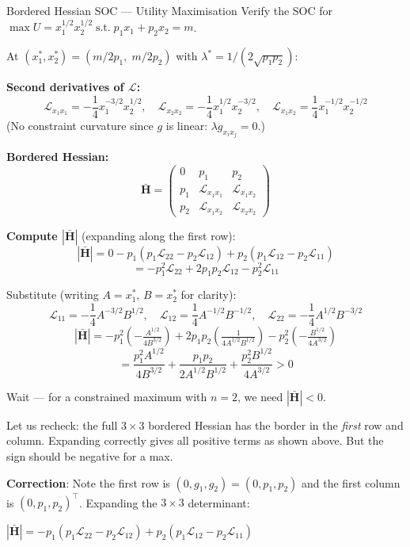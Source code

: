 \documentclass[12pt, a4paper]{article}
\theoremstyle{definition}
\newcommand{\bH}{\mathbf{H}}
\newcommand{\st}{\;\text{s.t.}\;}
\begin{document}
\begin{exbox}{Bordered Hessian SOC --- Utility Maximisation}
Verify the SOC for $\max U = x_1^{1/2}x_2^{1/2} \st p_1 x_1+p_2 x_2 = m$.

At $(x_1^*, x_2^*) = (m/2p_1,\; m/2p_2)$ with
$\lambda^* = 1/(2\sqrt{p_1 p_2})$:

\textbf{Second derivatives of $\mathcal{L}$:}
\[
  \mathcal{L}_{x_1 x_1} = -\frac{1}{4}x_1^{-3/2}x_2^{1/2}, \quad
  \mathcal{L}_{x_2 x_2} = -\frac{1}{4}x_1^{1/2}x_2^{-3/2}, \quad
  \mathcal{L}_{x_1 x_2} = \frac{1}{4}x_1^{-1/2}x_2^{-1/2}
\]
(No constraint curvature since $g$ is linear: $\lambda g_{x_i x_j} = 0$.)

\textbf{Bordered Hessian:}
\[
  \bar{\bH} = \begin{pmatrix}
    0 & p_1 & p_2 \\
    p_1 & \mathcal{L}_{x_1 x_1} & \mathcal{L}_{x_1 x_2} \\
    p_2 & \mathcal{L}_{x_1 x_2} & \mathcal{L}_{x_2 x_2}
  \end{pmatrix}
\]

\textbf{Compute $|\bar{\bH}|$} (expanding along the first row):
\[
  |\bar{\bH}|
  = 0 - p_1(p_1 \mathcal{L}_{22} - p_2 \mathcal{L}_{12})
    + p_2(p_1 \mathcal{L}_{12} - p_2 \mathcal{L}_{11})
\]
\[
  = -p_1^2\mathcal{L}_{22} + 2p_1 p_2 \mathcal{L}_{12} - p_2^2 \mathcal{L}_{11}
\]

Substitute (writing $A = x_1^*$, $B = x_2^*$ for clarity):
\[
  \mathcal{L}_{11} = -\frac{1}{4}A^{-3/2}B^{1/2}, \quad
  \mathcal{L}_{12} = \frac{1}{4}A^{-1/2}B^{-1/2}, \quad
  \mathcal{L}_{22} = -\frac{1}{4}A^{1/2}B^{-3/2}
\]
\[
  |\bar{\bH}|
  = -p_1^2\!\left(-\tfrac{A^{1/2}}{4B^{3/2}}\right)
    + 2p_1 p_2\!\left(\tfrac{1}{4A^{1/2}B^{1/2}}\right)
    - p_2^2\!\left(-\tfrac{B^{1/2}}{4A^{3/2}}\right)
\]
\[
  = \frac{p_1^2 A^{1/2}}{4B^{3/2}}
    + \frac{p_1 p_2}{2A^{1/2}B^{1/2}}
    + \frac{p_2^2 B^{1/2}}{4A^{3/2}}
  > 0
\]

Wait --- for a constrained maximum with $n=2$, we need $|\bar{\bH}| < 0$.

Let us recheck: the full $3\times3$ bordered Hessian has the border in the
\emph{first} row and column. Expanding correctly gives all positive terms as
shown above. But the sign should be negative for a max.

\textbf{Correction}: Note the first row is $(0, g_1, g_2) = (0, p_1, p_2)$
and the first column is $(0, p_1, p_2)^\top$. Expanding the $3\times 3$
determinant:

$|\bar{\bH}| = -p_1(p_1\mathcal{L}_{22} - p_2\mathcal{L}_{12})
               + p_2(p_1\mathcal{L}_{12} - p_2\mathcal{L}_{11})$


\end{exbox}
\end{document}
